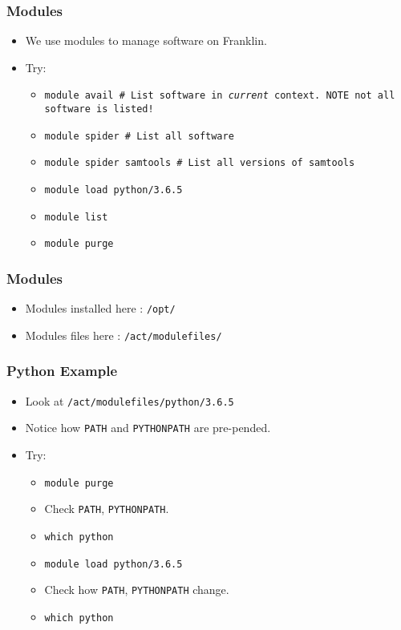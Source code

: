 \documentclass{beamer}
\newcommand{\code}[1]{\colorbox{codegray}{\texttt{#1}}}
\begin{document}
\begin{frame}
\frametitle{Modules}
\begin{itemize}
    \item We use modules to manage software on Franklin.
    \pause
    \bigskip
    \item Try:
    \pause
    \begin{itemize}
        \item \code{module avail # List software in \emph{current} context. NOTE not all software is listed! }
        \bigskip
        \pause
        \item \code{module spider # List all software}
        \bigskip
        \pause
        \item \code{module spider samtools # List all versions of samtools}
        \bigskip
        \pause
        \item \code{module load python/3.6.5}
        \bigskip
        \pause
        \item \code{module list}
        \bigskip
        \pause
        \item \code{module purge}
    \end{itemize}
\end{itemize}
\end{frame}


\begin{frame}
\frametitle{Modules}
\begin{itemize}
    \item Modules installed here : \code{/opt/}
    \pause
    \bigskip
    \item Modules files here : \code{/act/modulefiles/}
\end{itemize}
\end{frame}






\begin{frame}
\frametitle{Python Example}
\begin{itemize}
    \item Look at \code{/act/modulefiles/python/3.6.5}
    \pause
    \item Notice how \code{PATH} and \code{PYTHONPATH} are pre-pended.
    \pause
    \item Try:
    \begin{itemize}
        \item \code{module purge}
        \pause
        \item Check \code{PATH}, \code{PYTHONPATH}.
        \pause
        \item \code{which python}
        \pause
        \item \code{module load python/3.6.5}
        \pause
        \item Check how \code{PATH}, \code{PYTHONPATH} change.
        \pause
        \item \code{which python}
    \end{itemize}
\end{itemize}
\end{frame}
\end{document}
